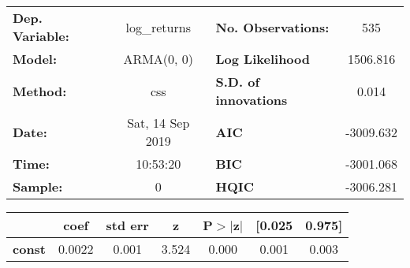 \begin{center}
\begin{tabular}{lclc}
\toprule
\textbf{Dep. Variable:} &   log\_returns   & \textbf{  No. Observations:  } &    535      \\
\textbf{Model:}         &    ARMA(0, 0)    & \textbf{  Log Likelihood     } &  1506.816   \\
\textbf{Method:}        &       css        & \textbf{  S.D. of innovations} &   0.014     \\
\textbf{Date:}          & Sat, 14 Sep 2019 & \textbf{  AIC                } & -3009.632   \\
\textbf{Time:}          &     10:53:20     & \textbf{  BIC                } & -3001.068   \\
\textbf{Sample:}        &        0         & \textbf{  HQIC               } & -3006.281   \\
\bottomrule
\end{tabular}
\begin{tabular}{lcccccc}
               & \textbf{coef} & \textbf{std err} & \textbf{z} & \textbf{P$> |$z$|$} & \textbf{[0.025} & \textbf{0.975]}  \\
\midrule
\textbf{const} &       0.0022  &        0.001     &     3.524  &         0.000        &        0.001    &        0.003     \\
\bottomrule
\end{tabular}
\end{center}
